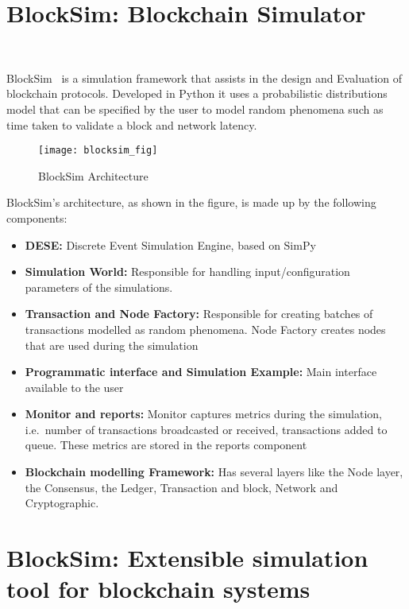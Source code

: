 \section{BlockSim: Blockchain Simulator}~\label{subsec:blocksim1}

BlockSim~\cite{blocksim1} is a simulation framework that assists in the design and Evaluation
of blockchain protocols. Developed in Python it uses a probabilistic distributions model that
can be specified by the user to model random phenomena such as time taken to validate a block and
network latency.

\begin{figure}[h]
	\centering
	\texttt{[image: blocksim\_fig]}
	\caption{BlockSim Architecture~\cite{blocksim1}}
	\label{fig:blocksim_fig}
\end{figure}

BlockSim's architecture, as shown in the figure, is made up by the following components:

\begin{itemize}
  \item \textbf{DESE:} Discrete Event Simulation Engine, based on SimPy
  \item \textbf{Simulation World:} Responsible for handling input/configuration parameters
  of the simulations.
  \item \textbf{Transaction and Node Factory:} Responsible for creating batches of 
  transactions modelled as random phenomena. Node Factory creates nodes that are used 
  during the simulation
  \item \textbf{Programmatic interface and Simulation Example:} Main interface available to 
  the user
  \item \textbf{Monitor and reports:} Monitor captures metrics during the simulation, 
  i.e.\ number of transactions broadcasted or received, transactions added to queue. 
  These metrics are stored in the reports component
  \item \textbf{Blockchain modelling Framework:} Has several layers like the Node layer,
  the Consensus, the Ledger, Transaction and block, Network and Cryptographic.
\end{itemize}

\section{BlockSim: Extensible simulation tool for blockchain systems}~\label{subsec:blocksim2}

